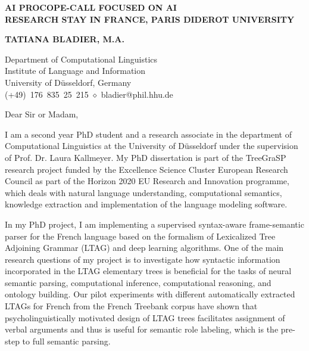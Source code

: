 \documentclass{resume} %
\begin{document}
\thispagestyle{empty}

\vspace{-5em}
\begin{center}

\textbf{\Large AI PROCOPE-CALL FOCUSED ON AI \\[5pt] RESEARCH STAY IN FRANCE, PARIS DIDEROT UNIVERSITY}

\vspace{10pt}

\textbf{\large TATIANA BLADIER, M.A.}

Department of Computational Linguistics \\
Institute of Language and Information \\
University of D{\"u}sseldorf, Germany \\ %
(+49)~176~835~25~215 $\diamond$ bladier@phil.hhu.de %

\vspace{15pt}

\end{center}

\normalsize

\vspace{10pt}

Dear Sir or Madam,

I am a second year PhD student and a research associate in the department of Computational Linguistics at the University of D{\"u}sseldorf under the supervision of Prof. Dr. Laura Kallmeyer. My PhD dissertation is part of the TreeGraSP research project funded by the Excellence Science Cluster European Research Council as part of the Horizon 2020 EU Research and Innovation programme, which deals with natural language understanding, computational semantics, knowledge extraction and implementation of the language modeling software.

In my PhD project, I am implementing a supervised syntax-aware frame-semantic parser for the French language based on the formalism of Lexicalized Tree Adjoining Grammar (LTAG) and deep learning algorithms. One of the main research questions of my project is to investigate how syntactic information incorporated in the LTAG elementary trees is beneficial for the tasks of neural semantic parsing, computational inference, computational reasoning, and ontology building. Our pilot experiments with different automatically extracted LTAGs for French from the French Treebank corpus have shown that psycholinguistically motivated design of LTAG trees facilitates assignment of verbal arguments and thus is useful for semantic role labeling, which is the pre-step to full semantic parsing. 
\end{document}
